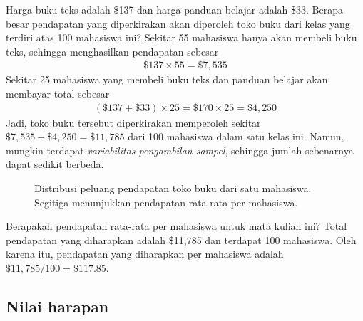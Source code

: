 \begin{examplewrap}
\begin{nexample}{Harga buku teks adalah \$137 dan harga panduan belajar adalah \$33. Berapa besar pendapatan yang diperkirakan akan diperoleh toko buku dari kelas yang terdiri atas 100 mahasiswa ini?}\label{bookStoreRev}
Sekitar 55 mahasiswa hanya akan membeli buku teks, sehingga menghasilkan pendapatan sebesar
\begin{align*}
\$137 \times  55 = \$7,535
\end{align*}
Sekitar 25 mahasiswa yang membeli buku teks dan panduan belajar akan membayar total sebesar
\begin{align*}
(\$137 + \$33) \times  25 = \$170 \times  25 = \$4,250
\end{align*}
Jadi, toko buku tersebut diperkirakan memperoleh sekitar $\$7,535 + \$4,250 = \$11,785$ dari 100 mahasiswa dalam satu kelas ini. Namun, mungkin terdapat \emph{variabilitas pengambilan sampel}, sehingga jumlah sebenarnya dapat sedikit berbeda.
\end{nexample}
\end{examplewrap}

\begin{figure}[h]
  \centering
  \caption{Distribusi peluang pendapatan toko buku
      dari satu mahasiswa.
      Segitiga menunjukkan
      pendapatan rata-rata per mahasiswa.}
  \label{bookCostDist}
\end{figure}

\D{\newpage}

\begin{examplewrap}
\begin{nexample}{Berapakah pendapatan rata-rata per mahasiswa untuk mata kuliah ini?}\label{revFromStudent}
Total pendapatan yang diharapkan adalah \$11,785 dan terdapat 100 mahasiswa. Oleh karena itu, pendapatan yang diharapkan per mahasiswa adalah $\$11,785/100 =  \$117.85$.
\end{nexample}
\end{examplewrap}

\subsection{Nilai harapan}

